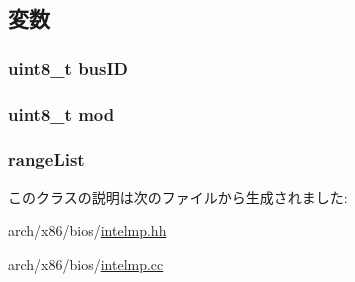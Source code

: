 \subsection{変数}
\hypertarget{classX86ISA_1_1IntelMP_1_1CompatAddrSpaceMod_ac86b1934f811ad40b20b27d29c52a5d3}{
\subsubsection[{busID}]{\setlength{\rightskip}{0pt plus 5cm}uint8\_\-t {\bf busID}}}
\label{classX86ISA_1_1IntelMP_1_1CompatAddrSpaceMod_ac86b1934f811ad40b20b27d29c52a5d3}
\hypertarget{classX86ISA_1_1IntelMP_1_1CompatAddrSpaceMod_a7e6d6c4ffa3ecb61cde728e16c91deee}{
\subsubsection[{mod}]{\setlength{\rightskip}{0pt plus 5cm}uint8\_\-t {\bf mod}}}
\label{classX86ISA_1_1IntelMP_1_1CompatAddrSpaceMod_a7e6d6c4ffa3ecb61cde728e16c91deee}
\hypertarget{classX86ISA_1_1IntelMP_1_1CompatAddrSpaceMod_adefdce6f0c37ed6402c8283d6d4093e1}{
\subsubsection[{rangeList}]{ {\bf rangeList}}}
\label{classX86ISA_1_1IntelMP_1_1CompatAddrSpaceMod_adefdce6f0c37ed6402c8283d6d4093e1}


このクラスの説明は次のファイルから生成されました:\begin{DoxyCompactItemize}
\item 
arch/x86/bios/\hyperlink{intelmp_8hh}{intelmp.hh}\item 
arch/x86/bios/\hyperlink{intelmp_8cc}{intelmp.cc}\end{DoxyCompactItemize}
